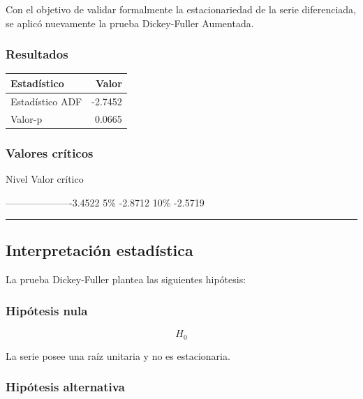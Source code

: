\documentclass[11pt]{article}
\begin{document}
Con el objetivo de validar formalmente la estacionariedad de la serie
diferenciada, se aplicó nuevamente la prueba Dickey-Fuller Aumentada.

\hypertarget{resultados}{%
\subsubsection{Resultados}\label{resultados}}

\begin{longtable}[]{@{}lr@{}}
\toprule\noalign{}
Estadístico & Valor \\
\midrule\noalign{}
\endhead
\bottomrule\noalign{}
\endlastfoot
Estadístico ADF & -2.7452 \\
Valor-p & 0.0665 \\
\end{longtable}

\hypertarget{valores-cruxedticos}{%
\subsubsection{Valores críticos}\label{valores-cruxedticos}}

Nivel \textbar{} Valor crítico \textbar{}

\textbar--------\textbar-------------3.4522 \textbar{} \textbar{} 5\%
\textbar{} -2.8712 \textbar{} \textbar{} 10\% \textbar{} -2.5719
\textbar{}

\begin{center}\rule{0.5\linewidth}{0.5pt}\end{center}

\hypertarget{interpretaciuxf3n-estaduxedstica}{%
\subsection{Interpretación
estadística}\label{interpretaciuxf3n-estaduxedstica}}

La prueba Dickey-Fuller plantea las siguientes hipótesis:

\hypertarget{hipuxf3tesis-nula}{%
\subsubsection{Hipótesis nula}\label{hipuxf3tesis-nula}}

\[
H_0
\]

La serie posee una raíz unitaria y no es estacionaria.

\hypertarget{hipuxf3tesis-alternativa}{%
\subsubsection{Hipótesis alternativa}\label{hipuxf3tesis-alternativa}}
\end{document}
